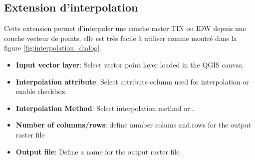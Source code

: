 
%
%

\subsection{Extension d'interpolation}

Cette extension permet d'interpoler une couche raster TIN ou IDW depuis une couche vecteur de points, elle est tr\`es facile \`a utiliser comme montr\'e dans la figure \ref{fig:interpolation_dialog}.


\begin{itemize}
\item \textbf{Input vector layer}: Select vector point layer loaded in the QGIS canvas.
\item \textbf{Interpolation attribute}: Select attribute column used for interpolation or 
enable  checkbox.
\item \textbf{Interpolation Method}: Select interpolation method  or .
\item \textbf{Number of columns/rows}: define number colums and.rows for the output raster file
\item \textbf{Output file}: Define a name for the output raster file
\end{itemize}

